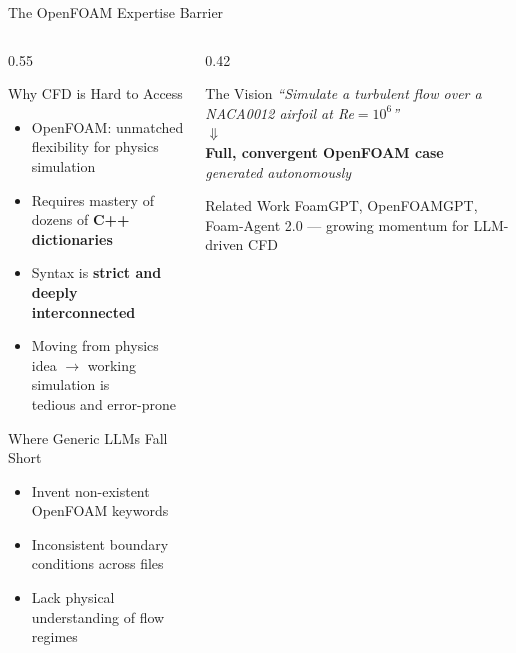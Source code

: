\documentclass[aspectratio=169,10pt]{beamer}
\begin{document}
\begin{frame}{The OpenFOAM Expertise Barrier}
  \begin{columns}
    \begin{column}{0.55\textwidth}
      \begin{block}{Why CFD is Hard to Access}
        \begin{itemize}
          \item OpenFOAM: unmatched flexibility for physics simulation
          \item Requires mastery of dozens of \textbf{C++ dictionaries}
          \item Syntax is \textbf{strict and deeply interconnected}
          \item Moving from physics idea $\to$ working simulation is \\ tedious and error-prone
        \end{itemize}
      \end{block}
      \vspace{4pt}
      \begin{alertblock}{Where Generic LLMs Fall Short}
        \begin{itemize}
          \item Invent non-existent OpenFOAM keywords
          \item Inconsistent boundary conditions across files
          \item Lack physical understanding of flow regimes
        \end{itemize}
      \end{alertblock}
    \end{column}
    \begin{column}{0.42\textwidth}
      \begin{exampleblock}{The Vision}
        \centering\vspace{6pt}
        \large
        \textit{``Simulate a turbulent flow over a NACA0012 airfoil at Re$= 10^6$''}\\[8pt]
        $\Downarrow$\\[6pt]
        \textbf{Full, convergent OpenFOAM case}\\
        \textit{generated autonomously}
        \vspace{6pt}
      \end{exampleblock}
      \vspace{4pt}
      \begin{block}{Related Work}
        \small
        FoamGPT, OpenFOAMGPT, Foam-Agent 2.0 — growing momentum for LLM-driven CFD
      \end{block}
    \end{column}
  \end{columns}
\end{frame}
\end{document}
